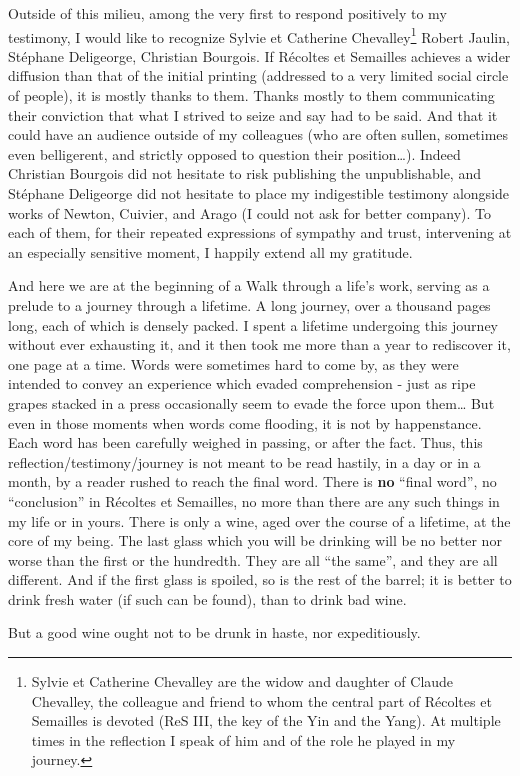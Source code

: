 Outside of this milieu, among the very first to respond positively to my testimony,
I would like to recognize 
Sylvie et Catherine Chevalley\footnote{Sylvie et Catherine Chevalley are the widow and
daughter of Claude Chevalley, the colleague and friend to whom the central part of 
R\'ecoltes et Semailles is devoted (ReS III, the key of the Yin and the Yang).
At multiple times in the reflection I speak of him and of the role he played in my
journey.} Robert Jaulin, St\'ephane Deligeorge, Christian Bourgois. 
If R\'ecoltes et Semailles achieves a wider diffusion than that of the initial 
printing (addressed to a very limited social circle of people), it is mostly thanks to
them. Thanks mostly to them communicating their 
conviction that what I strived to seize and say had to be said. 
And that it could have an audience outside of my colleagues (who are often sullen,
sometimes even belligerent, and strictly opposed to question their position\ldots).
Indeed Christian Bourgois did not hesitate to risk publishing the unpublishable, and
St\'ephane Deligeorge did not hesitate to place my 
indigestible testimony alongside works of Newton, Cuivier, and Arago (I could not ask for
better company).
To each of them, for their repeated expressions of sympathy and trust, intervening at an
especially sensitive moment, I happily extend all my gratitude. 

And here we are at the beginning of a Walk through a life's work, serving as a prelude to
a journey through a lifetime. 
A long journey, over a thousand pages long, each of which is
densely packed. I spent a lifetime undergoing this journey without ever 
exhausting it, and it then took me more than a year to rediscover it, 
one page at a time.
Words were sometimes hard to come by, as they were 
intended to convey an experience which evaded comprehension - just as ripe grapes stacked
in a press occasionally seem to evade the force upon them\ldots
But even in those moments when words come flooding, it is not by happenstance. 
Each word has been carefully 
weighed in passing, or after the fact.
Thus, this reflection/testimony/journey is not meant to be read hastily, in a day or in a
month, by a reader rushed to reach the final word. There is \textbf{no} 
``final word'', no
``conclusion'' in 
R\'ecoltes et Semailles, no more than there are any such things in my life or in yours. 
There is only a wine, aged over the course of a lifetime, at the core of my being.
The last glass which you will be drinking will be no better nor worse than the first or the
hundredth. 
They are all ``the same'', and they are all different. And if the first glass is spoiled,
so is the rest of the barrel; it is better to drink fresh water (if such can be found),
than to drink bad wine. 

But a good wine ought not to be drunk in haste, nor 
expeditiously. 

% 
